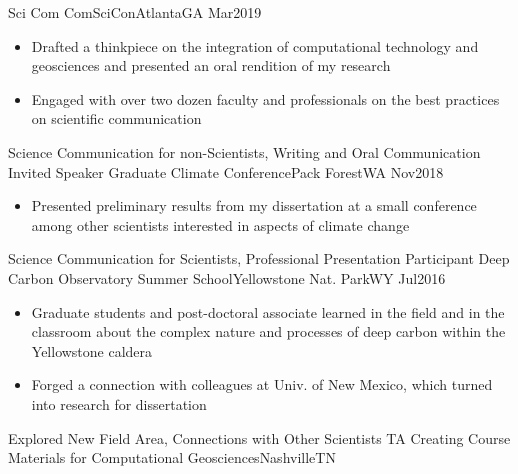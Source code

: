 %
%
%


\begin{experiences}
\experience
    {Sci Com}       {ComSciCon}{Atlanta}{GA}
    {Mar2019}      {
                      \begin{itemize}
                        \item Drafted a thinkpiece on the integration of computational technology and geosciences and presented an oral rendition of my research
                        \item Engaged with over two dozen faculty and professionals on the best practices on scientific communication
                      \end{itemize}
                    }
                    {Science Communication for non-Scientists, Writing and Oral Communication}
  \emptySeparator
\experience
    {Invited Speaker}       {Graduate Climate Conference}{Pack Forest}{WA}
    {Nov2018}      {
                      \begin{itemize}
                        \item Presented preliminary results from my dissertation at a small conference among other scientists interested in aspects of climate change
                      \end{itemize}
                    }
                    {Science Communication for Scientists, Professional Presentation}
  \emptySeparator  
 \experience
    {Participant}       {Deep Carbon Observatory Summer School}{Yellowstone Nat. Park}{WY}
    {Jul2016}      {
                      \begin{itemize}
                        \item Graduate students and post-doctoral associate learned in the field and in the classroom about the complex nature and processes of deep carbon within the Yellowstone caldera
                        \item Forged a connection with colleagues at Univ. of New Mexico, which turned into research for dissertation
                      \end{itemize}
                    }
                    {Explored New Field Area, Connections with Other Scientists}
  \emptySeparator  
 \experience
    {TA}       {Creating Course Materials for Computational Geosciences}{Nashville}{TN}

\end{experiences}
